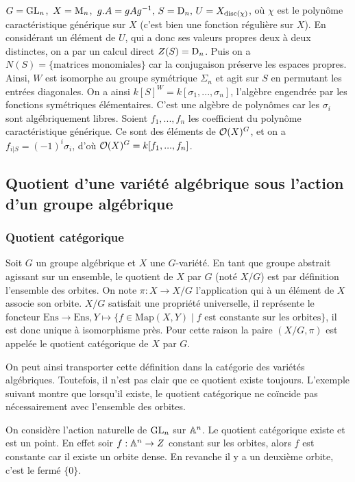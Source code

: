 \begin{ex}
$G=\operatorname{GL}_n$,\, $X=\operatorname{M}_n$,\, $g.A=gAg^{-1},\, S=\operatorname{D}_n,\, U=X_{\operatorname{disc}(\chi )}$, où $\chi$ est le polynôme caractéristique générique sur $X$ (c'est bien une fonction régulière sur $X$). En considérant un élément de $U$, qui a donc ses valeurs propres deux à deux distinctes, on a par un calcul direct $Z(S)=\operatorname{D}_n$. Puis on a $N(S)=\lbrace\textrm{matrices monomiales}\rbrace$ car la conjugaison préserve les espaces propres. Ainsi, $W$ est isomorphe au groupe symétrique $\Sigma_n$ et agit sur $S$ en permutant les entrées diagonales. On a ainsi $k[S]^W=k[\sigma_1,...,\sigma _n]$, l'algèbre engendrée par les fonctions symétriques élémentaires. C'est une algèbre de polynômes car les $\sigma_i$ sont algébriquement libres. Soient $f_1,...,f_n$ les coefficient du polynôme caractéristique générique. Ce sont des éléments de $\mathcal{O}(X)^G$, et on a $f_{i| S}=(-1)^i\sigma _i$, d'où $\mathcal{O}(X)^G=k[f_1,...,f_n]$.
\end{ex}

\subsection{Quotient d'une variété algébrique sous l'action d'un groupe algébrique}

\subsubsection{Quotient catégorique}

Soit $G$ un groupe algébrique et $X$ une $G$-variété. En tant que groupe abstrait agissant sur un ensemble, le quotient de $X$ par $G$ (noté $X/G$) est par définition l'ensemble des orbites. On note $\pi:X \rightarrow X/G$ l'application qui à un élément de $X$ associe son orbite. $X/G$ satisfait une propriété universelle, il représente le foncteur $\textrm{Ens}\rightarrow \textrm{Ens}, Y\mapsto \lbrace f\in \textrm{Map}(X, Y)\mid f \textrm{ est constante sur les orbites} \rbrace$, il est donc unique à isomorphisme près. Pour cette raison la paire $(X
/G, \pi)$ est appelée le quotient catégorique de $X$ par $G$.

On peut ainsi transporter cette définition dans la catégorie des variétés algébriques. Toutefois, il n'est pas clair que ce quotient existe toujours. L'exemple suivant montre que lorsqu'il existe, le quotient catégorique ne coïncide pas nécessairement avec l'ensemble des orbites.

\begin{ex}
On considère l'action naturelle de $\operatorname{GL}_n$ sur $\mathbb{A}^n$. Le quotient catégorique existe et est un point. En effet soir $f:\mathbb{A}^n\rightarrow Z$ constant sur les orbites, alors $f$ est constante car il existe un orbite dense. En revanche il y a un deuxième orbite, c'est le fermé $\lbrace 0\rbrace$. 
\end{ex}

